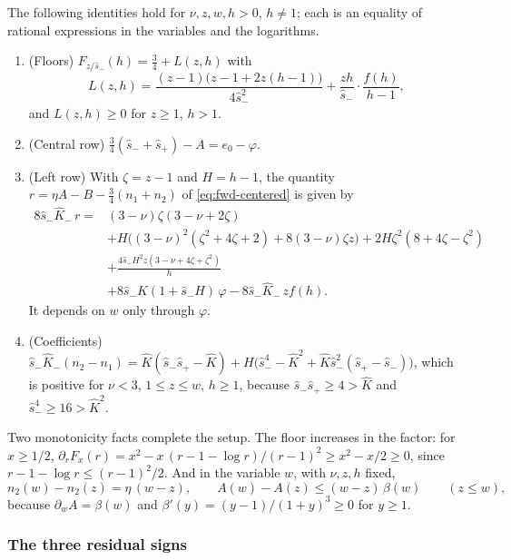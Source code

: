 The following identities hold for $\nu,z,w,h>0$, $h\ne1$; each is an equality of rational
expressions in the variables and the logarithms.
\begin{enumerate}
\item (Floors) $F_{z/\hat s_-}(h)=\frac34+L(z,h)$ with
  \[
  L(z,h)=\frac{(z-1)\bigl(z-1+2z(h-1)\bigr)}{4\hat s_-^2}+\frac{zh}{\hat s_-}\cdot\frac{f(h)}{h-1},
  \]
  and $L(z,h)\ge0$ for $z\ge1$, $h>1$.
\item (Central row) $\frac34(\hat s_-+\hat s_+)-A=e_0-\varphi$.
\item (Left row) With $\zeta=z-1$ and $H=h-1$, the quantity $r=\eta A-B-\frac34(n_1+n_2)$ of
  \eqref{eq:fwd-centered} is given by
  \begin{align*}
  8\hat s_-\hat K_-\,r={}&(3-\nu)\zeta(3-\nu+2\zeta)\\
  &+H\bigl((3-\nu)^2(\zeta^2+4\zeta+2)+8(3-\nu)\zeta z\bigr)
  +2H\zeta^2(8+4\zeta-\zeta^2)\\
  &+\frac{4\hat s_-H^2z(3-\nu+4\zeta+\zeta^2)}{h}\\
  &+8\hat s_-\hat K(1+\hat s_-H)\,\varphi-8\hat s_-\hat K_-\,zf(h).
  \end{align*}
  It depends on $w$ only through $\varphi$.
\item (Coefficients) $\hat s_-\hat K_-(n_2-n_1)=\hat K(\hat s_-\hat s_+-\hat K)
  +H\bigl(\hat s_-^4-\hat K^2+\hat K\hat s_-^2(\hat s_+-\hat s_-)\bigr)$, which is positive for
  $\nu<3$, $1\le z\le w$, $h\ge1$, because $\hat s_-\hat s_+\ge4>\hat K$ and
  $\hat s_-^4\ge16>\hat K^2$.
\end{enumerate}
Two monotonicity facts complete the setup. The floor increases in the factor: for $x\ge1/2$,
$\partial_rF_x(r)=x^2-x\,(r-1-\log r)/(r-1)^2\ge x^2-x/2\ge0$, since
$r-1-\log r\le(r-1)^2/2$. And in the variable $w$, with $\nu,z,h$ fixed,
\[
n_2(w)-n_2(z)=\eta\,(w-z),\qquad A(w)-A(z)\le(w-z)\,\beta(w)\qquad(z\le w),
\]
because $\partial_wA=\beta(w)$ and $\beta'(y)=(y-1)/(1+y)^3\ge0$ for $y\ge1$.

\subsubsection{The three residual signs}\label{app:fwd-signs}

